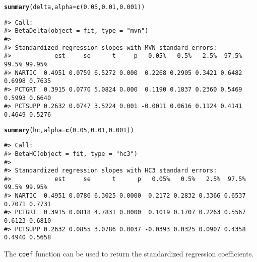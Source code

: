 \documentclass[man]{apa7}\usepackage[]{graphicx}\usepackage[]{xcolor}
\makeatletter
\newcommand{\hlnum}[1]{\textcolor[rgb]{0.686,0.059,0.569}{#1}}%
\newcommand{\hlstd}[1]{\textcolor[rgb]{0.345,0.345,0.345}{#1}}%
\newcommand{\hlkwc}[1]{\textcolor[rgb]{0.333,0.667,0.333}{#1}}%
\newcommand{\hlkwd}[1]{\textcolor[rgb]{0.737,0.353,0.396}{\textbf{#1}}}%
\newenvironment{kframe}{%
 \def\at@end@of@kframe{}%
 \ifinner\ifhmode%
  \def\at@end@of@kframe{\end{minipage}}%
  \begin{minipage}{\columnwidth}%
 \fi\fi%
 \def\FrameCommand##1{\hskip\@totalleftmargin \hskip-\fboxsep
 \colorbox{shadecolor}{##1}\hskip-\fboxsep
     \hskip-\linewidth \hskip-\@totalleftmargin \hskip\columnwidth}%
 \MakeFramed {\advance\hsize-\width
   \@totalleftmargin\z@ \linewidth\hsize
   \@setminipage}}%
 {\par\unskip\endMakeFramed%
 \at@end@of@kframe}
\newenvironment{knitrout}{}{} %
\makeatother
\begin{document}
\vspace{-.5em}
\begin{minipage}{.75\linewidth}
	\singlespacing
\begin{knitrout}\scriptsize
{}\color{fgcolor}\begin{kframe}
\begin{alltt}
\hlkwd{summary}\hlstd{(delta,} \hlkwc{alpha} \hlstd{=} \hlkwd{c}\hlstd{(}\hlnum{0.05}\hlstd{,} \hlnum{0.01}\hlstd{,} \hlnum{0.001}\hlstd{))}
\end{alltt}
\begin{verbatim}
#> Call:
#> BetaDelta(object = fit, type = "mvn")
#> 
#> Standardized regression slopes with MVN standard errors:
#>            est     se      t     p   0.05%   0.5%   2.5%  97.5%  99.5% 99.95%
#> NARTIC  0.4951 0.0759 6.5272 0.000  0.2268 0.2905 0.3421 0.6482 0.6998 0.7635
#> PCTGRT  0.3915 0.0770 5.0824 0.000  0.1190 0.1837 0.2360 0.5469 0.5993 0.6640
#> PCTSUPP 0.2632 0.0747 3.5224 0.001 -0.0011 0.0616 0.1124 0.4141 0.4649 0.5276
\end{verbatim}
\begin{alltt}
\hlkwd{summary}\hlstd{(hc,} \hlkwc{alpha} \hlstd{=} \hlkwd{c}\hlstd{(}\hlnum{0.05}\hlstd{,} \hlnum{0.01}\hlstd{,} \hlnum{0.001}\hlstd{))}
\end{alltt}
\begin{verbatim}
#> Call:
#> BetaHC(object = fit, type = "hc3")
#> 
#> Standardized regression slopes with HC3 standard errors:
#>            est     se      t      p   0.05%   0.5%   2.5%  97.5%  99.5% 99.95%
#> NARTIC  0.4951 0.0786 6.3025 0.0000  0.2172 0.2832 0.3366 0.6537 0.7071 0.7731
#> PCTGRT  0.3915 0.0818 4.7831 0.0000  0.1019 0.1707 0.2263 0.5567 0.6123 0.6810
#> PCTSUPP 0.2632 0.0855 3.0786 0.0037 -0.0393 0.0325 0.0907 0.4358 0.4940 0.5658
\end{verbatim}
\end{kframe}
\end{knitrout}
\end{minipage}

\noindent The \texttt{coef} function can be used to return the standardized regression coefficients.
\end{document}
